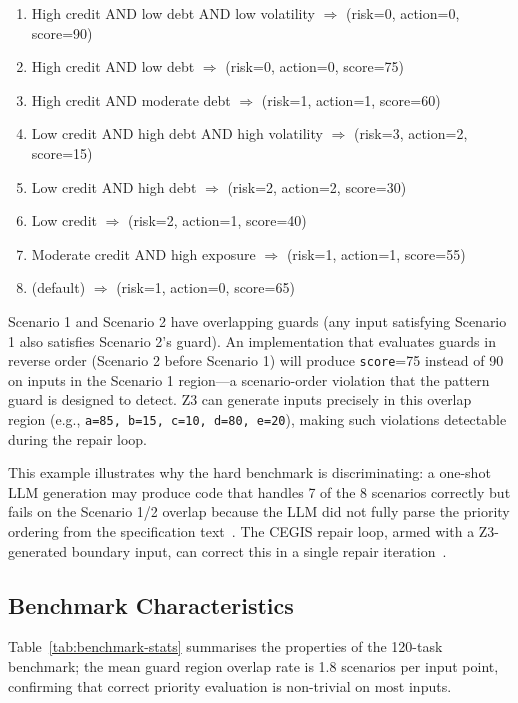 \begin{enumerate}
  \item High credit AND low debt AND low volatility $\Rightarrow$ (risk=0, action=0, score=90)
  \item High credit AND low debt $\Rightarrow$ (risk=0, action=0, score=75)
  \item High credit AND moderate debt $\Rightarrow$ (risk=1, action=1, score=60)
  \item Low credit AND high debt AND high volatility $\Rightarrow$ (risk=3, action=2, score=15)
  \item Low credit AND high debt $\Rightarrow$ (risk=2, action=2, score=30)
  \item Low credit $\Rightarrow$ (risk=2, action=1, score=40)
  \item Moderate credit AND high exposure $\Rightarrow$ (risk=1, action=1, score=55)
  \item (default) $\Rightarrow$ (risk=1, action=0, score=65)
\end{enumerate}

Scenario 1 and Scenario 2 have overlapping guards (any input satisfying Scenario 1
also satisfies Scenario 2's guard).  An implementation that evaluates guards in
reverse order (Scenario 2 before Scenario 1) will produce \texttt{score}=75 instead
of 90 on inputs in the Scenario 1 region---a scenario-order violation that
the pattern guard is designed to detect.  Z3 can generate inputs precisely in this
overlap region (e.g., \texttt{a=85, b=15, c=10, d=80, e=20}), making such violations
detectable during the repair loop.

This example illustrates why the hard benchmark is discriminating: a one-shot LLM
generation may produce code that handles 7 of the 8 scenarios correctly but fails on
the Scenario 1/2 overlap because the LLM did not fully parse the priority ordering
from the specification text~\citep{chen2021codex,dakhel2023copilot}.  The CEGIS repair loop, armed with a Z3-generated
boundary input, can correct this in a single repair iteration~\citep{solarlezama2008sketching,lynn2024verifierloop}.

\subsection{Benchmark Characteristics}

Table~\ref{tab:benchmark-stats} summarises the properties of the 120-task benchmark;
the mean guard region overlap rate is 1.8 scenarios per input point, confirming that
correct priority evaluation is non-trivial on most inputs.

